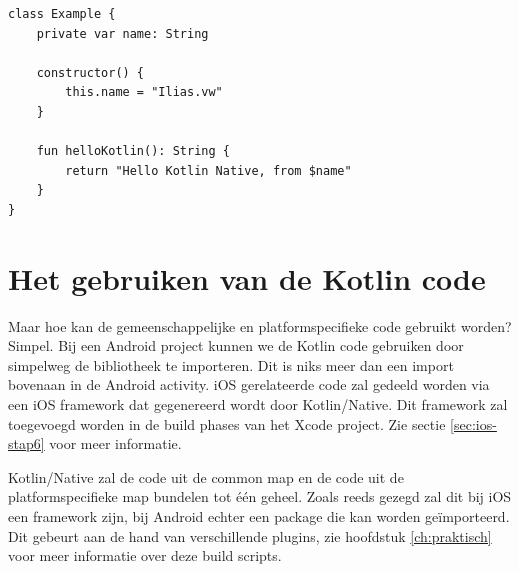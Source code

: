 \begin{lstlisting}
class Example {
	private var name: String
	
	constructor() {
		this.name = "Ilias.vw"
	}
	
	fun helloKotlin(): String {
		return "Hello Kotlin Native, from $name"
	}
}
\end{lstlisting}

\section {Het gebruiken van de Kotlin code}
\label{sec:use-ios-code}
Maar hoe kan de gemeenschappelijke en platformspecifieke code gebruikt worden? Simpel. Bij een Android project kunnen we de Kotlin code gebruiken door simpelweg de bibliotheek te importeren. Dit is niks meer dan een import bovenaan in de Android activity. iOS gerelateerde code zal gedeeld worden via een iOS framework dat gegenereerd wordt door Kotlin/Native. Dit framework zal toegevoegd worden in de build phases van het Xcode project. Zie sectie \ref{sec:ios-stap6} voor meer informatie.

Kotlin/Native zal de code uit de common map en de code uit de platformspecifieke map bundelen tot één geheel. Zoals reeds gezegd zal dit bij iOS een framework zijn, bij Android echter een package die kan worden geïmporteerd. Dit gebeurt aan de hand van verschillende plugins, zie hoofdstuk \ref{ch:praktisch} voor meer informatie over deze build scripts.
